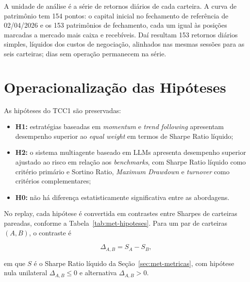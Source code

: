 \documentclass{eic-bcc-tcc}
\begin{document}
A unidade de análise é a série de retornos diários de cada carteira. A curva de patrimônio tem 154 pontos: o capital inicial no fechamento de referência de 02/04/2026 e os 153 patrimônios de fechamento, cada um igual às posições marcadas a mercado mais caixa e recebíveis. Daí resultam 153 retornos diários simples, líquidos dos custos de negociação, alinhados nas mesmas sessões para as seis carteiras; dias sem operação permanecem na série.

\section{Operacionalização das Hipóteses}
\label{sec:met-hipoteses}

As hipóteses do TCC1 são preservadas:

\begin{itemize}
    \item \textbf{H1:} estratégias baseadas em \textit{momentum} e \textit{trend following} apresentam desempenho superior ao \textit{equal weight} em termos de Sharpe Ratio líquido;
    \item \textbf{H2:} o sistema multiagente baseado em LLMs apresenta desempenho superior ajustado ao risco em relação aos \textit{benchmarks}, com Sharpe Ratio líquido como critério primário e Sortino Ratio, \textit{Maximum Drawdown} e \textit{turnover} como critérios complementares;
    \item \textbf{H0:} não há diferença estatisticamente significativa entre as abordagens.
\end{itemize}

No replay, cada hipótese é convertida em contrastes entre Sharpes de carteiras pareadas, conforme a Tabela~\ref{tab:met-hipoteses}. Para um par de carteiras $(A, B)$, o contraste é

\begin{equation}
\Delta_{A,B} = S_A - S_B,
\label{eq:met-contraste}
\end{equation}

\noindent em que $S$ é o Sharpe Ratio líquido da Seção~\ref{sec:met-metricas}, com hipótese nula unilateral $\Delta_{A,B} \leq 0$ e alternativa $\Delta_{A,B} > 0$.
\end{document}
